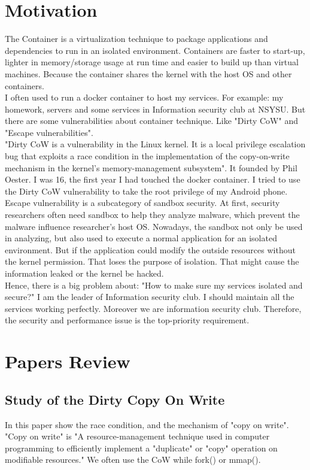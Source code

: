\documentclass[12pt,a4paper,oneside,draft]{IEEEconf}
\begin{document}
\section{Motivation}
The Container is a virtualization technique to package applications and dependencies to run in
an isolated environment. Containers are faster to start-up, lighter in memory/storage usage
at run time and easier to build up than virtual machines. Because the container shares the
kernel with the host OS and other containers.\\
I often used to run a docker container to host my services. For example: my homework,
servers and some services in Information security club at NSYSU.
But there are some vulnerabilities about container technique. Like "Dirty CoW\cite{Dirty_CoW}"
and "Escape vulnerabilities".\\
"Dirty CoW is a vulnerability in the Linux kernel. It is a local privilege escalation bug
that exploits a race condition in the implementation of the copy-on-write mechanism in the
kernel's memory-management subsystem"\cite{Dirty_CoW_wiki}. It founded by Phil Oester. I
was 16, the first year I had touched the docker container. I tried to use the Dirty CoW
vulnerability to take the root privilege of my Android phone.\\
Escape vulnerability is a subcategory of sandbox security. At first, security researchers often
need sandbox to help they analyze malware, which prevent the malware influence researcher's
host OS. Nowadays, the sandbox not only be used in analyzing, but also used to execute a
normal application for an isolated environment. But if the application could modify the
outside resources without the kernel permission. That loses the purpose of isolation. That
might cause the information leaked or the kernel be hacked.\\
Hence, there is a big problem about: "How to make sure my services isolated and secure?" I
am the leader of Information security club. I should maintain all the services working
perfectly. Moreover we are information security club. Therefore, the security and performance
issue is the top-priority requirement.\\


\section{Papers Review}
\subsection{Study of the Dirty Copy On Write\cite{Study_Dirty_Cow}}
In this paper show the race condition, and the mechanism of "copy on write".
"Copy on write" is "A resource-management technique used in computer programming to
efficiently implement a "duplicate" or "copy" operation on modifiable resources."
\cite{CoW_wiki} We often use the CoW while fork() or mmap().
\end{document}
